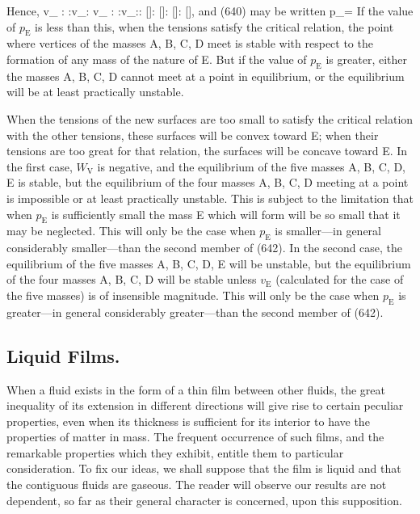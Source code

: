 \documentclass[12pt]{memoir}
\begin{document}
Hence,
\eqs v_ : :v_: v_ : :v_:: []: []: []: [],    \label{641}\eqe
and (640) may be written
\eqs p_=   \label{642}\eqe
If the value of $p_\text{E}$ is less than this, when the tensions satisfy the critical relation, the point where vertices of the masses A, B, C, D meet is stable with respect to the formation of any mass of the nature of E. But if the value of $p_\text{E}$ is greater, either the masses A, B, C, D cannot meet at a point in equilibrium, or the equilibrium will be at least practically unstable.

When the tensions of the new surfaces are too small to satisfy the critical relation with the other tensions, these surfaces will be convex toward E; when their tensions are too great for that relation, the surfaces will be concave toward E. In the first case, $W_\text{V}$ is negative, and the equilibrium of the five masses A, B, C, D, E is stable, but the equilibrium of the four masses A, B, C, D meeting at a point is impossible or at least practically unstable.  This is subject to the limitation that when $p_\text{E}$ is sufficiently small the mass E which will form will be so small that it may be neglected. This will only be the case when $p_\text{E}$ is smaller---in general considerably smaller---than the second member of (642). In the second case, the equilibrium of the five masses A, B, C, D, E will be unstable, but the equilibrium of the four masses A, B, C, D will be stable unless $v_\text{E}$ (calculated for the case of the five masses) is of insensible magnitude. This will only be the case when $p_\text{E}$ is greater---in general considerably greater---than the second member of (642).
\subsection{Liquid Films.}
When a fluid exists in the form of a thin film between other fluids, the great inequality of its extension in different directions will give rise to certain peculiar properties, even when its thickness is sufficient for its interior to have the properties of matter in mass. The frequent occurrence of such films, and the remarkable properties which they exhibit, entitle them to particular consideration. To fix our ideas, we shall suppose that the film is liquid and that the contiguous fluids are gaseous. The reader will observe our results are not dependent, so far as their general character is concerned, upon this supposition.
\end{document}
